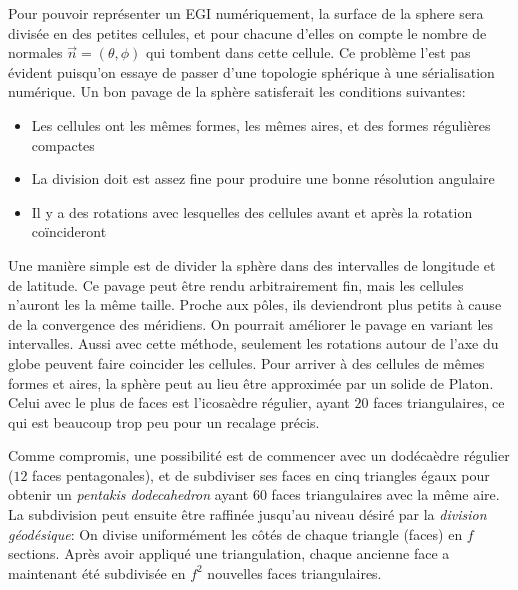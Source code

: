 \documentclass[a4paper,10pt]{scrreprt}
\begin{document}
Pour pouvoir représenter un EGI numériquement, la surface de la sphere sera divisée en des petites cellules, et pour chacune d'elles on compte le nombre de normales $\vec{n} = (\theta, \phi)$ qui tombent dans cette cellule. Ce problème l'est pas évident puisqu'on essaye de passer d'une topologie sphérique à une sérialisation numérique. Un bon pavage de la sphère satisferait les conditions suivantes: 
\begin{itemize}
	\item Les cellules ont les mêmes formes, les mêmes aires, et des formes régulières compactes
	\item La division doit est assez fine pour produire une bonne résolution angulaire
	\item Il y a des rotations avec lesquelles des cellules avant et après la rotation coïncideront
\end{itemize}

Une manière simple est de divider la sphère dans des intervalles de longitude et de latitude. Ce pavage peut être rendu arbitrairement fin, mais les cellules n'auront les la même taille. Proche aux pôles, ils deviendront plus petits à cause de la convergence des méridiens. On pourrait améliorer le pavage en variant les intervalles. Aussi avec cette méthode, seulement les rotations autour de l'axe du globe peuvent faire coincider les cellules. Pour arriver à des cellules de mêmes formes et aires, la sphère peut au lieu être approximée par un solide de Platon. Celui avec le plus de faces est l'icosaèdre régulier, ayant $20$ faces triangulaires, ce qui est beaucoup trop peu pour un recalage précis.

Comme compromis, une possibilité est de commencer avec un dodécaèdre régulier ($12$ faces pentagonales), et de subdiviser ses faces en cinq triangles égaux pour obtenir un \emph{pentakis dodecahedron} ayant $60$ faces triangulaires avec la même aire. La subdivision peut ensuite être raffinée jusqu'au niveau désiré par la \emph{division géodésique}: On divise uniformément les côtés de chaque triangle (faces) en $f$ sections. Après avoir appliqué une triangulation, chaque ancienne face a maintenant été subdivisée en $f^2$ nouvelles faces triangulaires.
\end{document}
